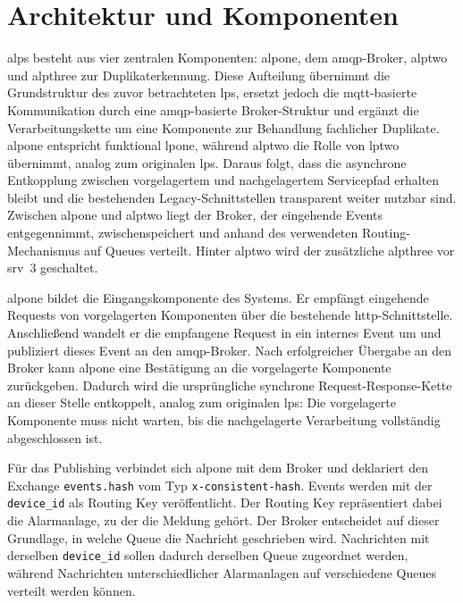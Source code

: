 \section{Architektur und Komponenten}

\gls{alps} besteht aus vier zentralen Komponenten: \gls{alpone}, dem \gls{amqp}-Broker, \gls{alptwo} und \gls{alpthree} zur Duplikaterkennung. Diese Aufteilung übernimmt die Grundstruktur des zuvor betrachteten \gls{lps}, ersetzt jedoch die \gls{mqtt}-basierte Kommunikation durch eine \gls{amqp}-basierte Broker-Struktur und ergänzt die Verarbeitungskette um eine Komponente zur Behandlung fachlicher Duplikate. \gls{alpone} entspricht funktional \gls{lpone}, während \gls{alptwo} die Rolle von \gls{lptwo} übernimmt, analog zum originalen \gls{lps}. Daraus folgt, dass die asynchrone Entkopplung zwischen vorgelagertem und nachgelagertem Servicepfad erhalten bleibt und die bestehenden Legacy-Schnittstellen transparent weiter nutzbar sind. Zwischen \gls{alpone} und \gls{alptwo} liegt der Broker, der eingehende Events entgegennimmt, zwischenspeichert und anhand des verwendeten Rout\-ing-Me\-cha\-nis\-mus auf Queues verteilt. Hinter \gls{alptwo} wird der zusätzliche \gls{alpthree} vor \gls{srv}~3 geschaltet.

\gls{alpone} bildet die Eingangskomponente des Systems. Er empfängt eingehende Requests von vorgelagerten Komponenten über die bestehende \gls{http}-Schnittstelle. Anschließend wandelt er die empfangene Request in ein internes Event um und publiziert dieses Event an den \gls{amqp}-Broker. Nach erfolgreicher Übergabe an den Broker kann \gls{alpone} eine Bestätigung an die vorgelagerte Komponente zurückgeben. Dadurch wird die ursprüngliche synchrone Request-Response-Kette an dieser Stelle entkoppelt, analog zum originalen \gls{lps}: Die vorgelagerte Komponente muss nicht warten, bis die nachgelagerte Verarbeitung vollständig abgeschlossen ist.

Für das Publishing verbindet sich \gls{alpone} mit dem Broker und deklariert den Exchange \texttt{events.hash} vom Typ \texttt{x-consistent-hash}. Events werden mit der \texttt{device\_id} als Routing Key veröffentlicht. Der Routing Key repräsentiert dabei die Alarmanlage, zu der die Meldung gehört. Der Broker entscheidet auf dieser Grundlage, in welche Queue die Nachricht geschrieben wird. Nachrichten mit derselben \texttt{device\_id} sollen dadurch derselben Queue zugeordnet werden, während Nachrichten unterschiedlicher Alarmanlagen auf verschiedene Queues verteilt werden können.

